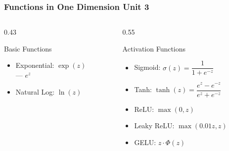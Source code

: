 \documentclass[12pt]{beamer}
\newcommand{\FrameTitle}[2]{\frametitle{#1 \hfill \small\textnormal{\textcolor{midgray}{#2}}}}
\begin{document}
\begin{frame}\FrameTitle{Functions in One Dimension}{Unit 3}
    \begin{columns}[t]
        \begin{column}{0.43\textwidth}
            \begin{block}{Basic Functions}
                \begin{itemize}
                    \item Exponential: $\exp(z)$\\\vspace*{1mm}
                        --- $e^{z}$
                    \item Natural Log: $\ln(z)$
                \end{itemize}
            \end{block}
        \end{column}

        \begin{column}{0.55\textwidth}
            \begin{block}{Activation Functions}
                \begin{itemize}
                    \item Sigmoid: $\sigma(z) = \dfrac{1}{1+e^{-z}}$
                    \item Tanh: $\tanh(z) = \dfrac{e^{z}-e^{-z}}{e^{z}+e^{-z}}$
                    \item ReLU: $\max(0,z)$
                    \item Leaky ReLU: $\max(0.01z,z)$
                    \item GELU: $z \cdot \Phi(z)$
                \end{itemize}
            \end{block}
        \end{column}
    \end{columns}
\end{frame}

\end{document}
